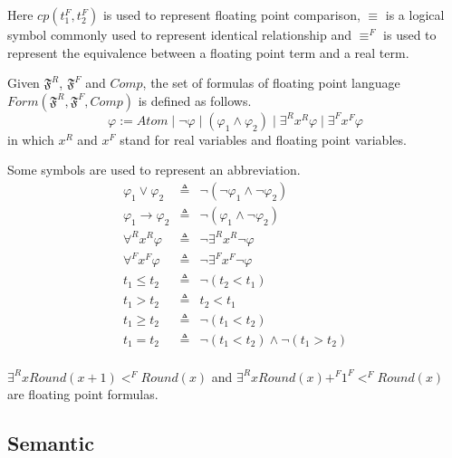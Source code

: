 \documentclass[12pt]{article}
\begin{document}
Here $cp(t_1^F, t_2^F)$ is used to represent floating point comparison, $\equiv$ is a logical symbol commonly used to represent identical relationship and $\equiv^F$ is used to represent the equivalence between a floating point term and a real term.

\begin{definition}
Given $\mathfrak{F}^R$, $\mathfrak{F}^F$ and $Comp$, the set of formulas of floating point language $Form(\mathfrak{F}^R,\mathfrak{F}^F, Comp)$ is defined as follows.
$$ \varphi := Atom \mid \neg \varphi \mid (\varphi_1 \wedge \varphi_2) \mid \exists^R x^R \varphi \mid \exists^F x^F \varphi$$
in which $x^R$ and $x^F$ stand for real variables and floating point variables.
\end{definition}

\begin{definition}[Abbreviations]
Some symbols are used to represent an abbreviation.
\begin{eqnarray*}
\varphi_1 \vee \varphi_2 &\triangleq& \neg (\neg \varphi_1 \wedge \neg \varphi_2) \\
\varphi_1 \to \varphi_2 &\triangleq& \neg(\varphi_1 \wedge \neg \varphi_2) \\
\forall^R x^R \varphi &\triangleq& \neg \exists^R x^R \neg\varphi \\
\forall^F x^F \varphi &\triangleq& \neg \exists^F x^F \neg\varphi \\
t_1 \leq t_2 &\triangleq& \neg (t_2<t_1) \\
t_1 > t_2 &\triangleq& t_2<t_1 \\
t_1 \geq t_2 &\triangleq& \neg (t_1 <t_2) \\
t_1 = t_2 &\triangleq& \neg (t_1 <t_2)\wedge\neg (t_1>t_2) \\
\end{eqnarray*}
\end{definition}

\begin{example}
$\exists^R x Round(x + 1) <^F Round(x)$ and $\exists^R x Round(x) +^F 1^F <^F Round(x)$ are floating point formulas.
\end{example}

\subsection{Semantic} \
\end{document}
